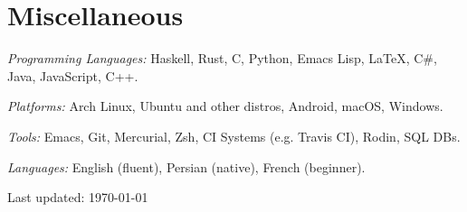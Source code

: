 \documentclass[12pt,letterpaper]{article}
\renewenvironment{itemize}{
  \begin{list}{}{
    \setlength{\leftmargin}{1.5em}
    \setlength{\itemsep}{0.25em}
    \setlength{\parskip}{0pt}
    \setlength{\parsep}{0.25em}
  }
}{
  \end{list}
}
\begin{document}
\section*{Miscellaneous}

\begin{itemize}
\item \textit{Programming Languages:} Haskell, Rust, C, Python, Emacs Lisp,
  \LaTeX, C\#, Java, JavaScript, C++.
\item \textit{Platforms:} Arch Linux, Ubuntu and other distros, Android, macOS,
  Windows.
\item \textit{Tools:} Emacs, Git, Mercurial, Zsh, CI Systems (e.g. Travis CI),
  Rodin, SQL DBs.
\item \textit{Languages:} English (fluent), Persian (native), French (beginner).
\end{itemize}


\bigskip
{\small Last updated: \today}
\end{document}
